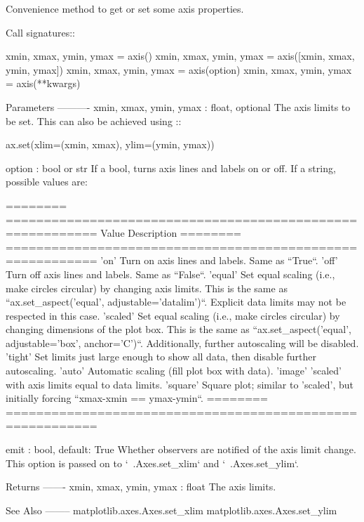 \begin{DoxyVerb}Convenience method to get or set some axis properties.

Call signatures::

  xmin, xmax, ymin, ymax = axis()
  xmin, xmax, ymin, ymax = axis([xmin, xmax, ymin, ymax])
  xmin, xmax, ymin, ymax = axis(option)
  xmin, xmax, ymin, ymax = axis(**kwargs)

Parameters
----------
xmin, xmax, ymin, ymax : float, optional
    The axis limits to be set.  This can also be achieved using ::

ax.set(xlim=(xmin, xmax), ylim=(ymin, ymax))

option : bool or str
    If a bool, turns axis lines and labels on or off. If a string,
    possible values are:

    ======== ==========================================================
    Value    Description
    ======== ==========================================================
    'on'     Turn on axis lines and labels. Same as ``True``.
    'off'    Turn off axis lines and labels. Same as ``False``.
    'equal'  Set equal scaling (i.e., make circles circular) by
     changing axis limits. This is the same as
     ``ax.set_aspect('equal', adjustable='datalim')``.
     Explicit data limits may not be respected in this case.
    'scaled' Set equal scaling (i.e., make circles circular) by
     changing dimensions of the plot box. This is the same as
     ``ax.set_aspect('equal', adjustable='box', anchor='C')``.
     Additionally, further autoscaling will be disabled.
    'tight'  Set limits just large enough to show all data, then
     disable further autoscaling.
    'auto'   Automatic scaling (fill plot box with data).
    'image'  'scaled' with axis limits equal to data limits.
    'square' Square plot; similar to 'scaled', but initially forcing
     ``xmax-xmin == ymax-ymin``.
    ======== ==========================================================

emit : bool, default: True
    Whether observers are notified of the axis limit change.
    This option is passed on to `~.Axes.set_xlim` and
    `~.Axes.set_ylim`.

Returns
-------
xmin, xmax, ymin, ymax : float
    The axis limits.

See Also
--------
matplotlib.axes.Axes.set_xlim
matplotlib.axes.Axes.set_ylim
\end{DoxyVerb}
 \mbox{\label{classmatplotlib_1_1axes_1_1__base_1_1__AxesBase_a8b9462e304f53956b675048256c9b860}} 
